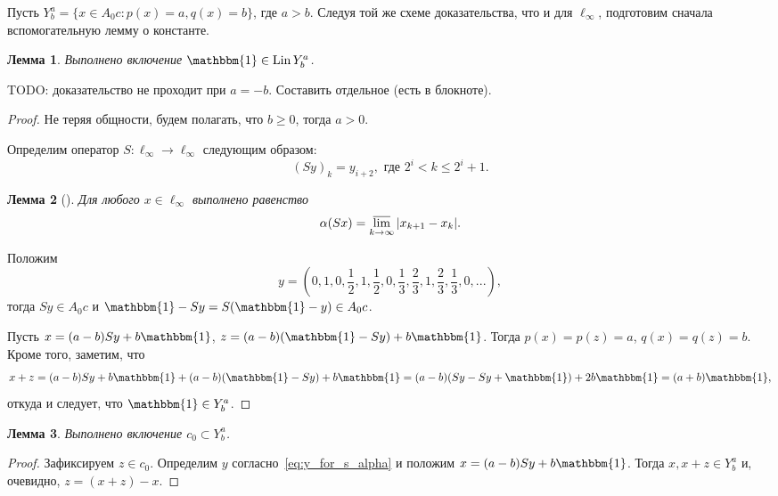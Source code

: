 \documentclass[a4paper,14pt]{article} %
\theoremstyle{plain}
\newtheorem{lemma}{Лемма}[section]
\begin{document}
Пусть $Y^a_b = \{x\in A_0 c : p(x) = a, q(x) = b\}$, где $a>b$.
Следуя той же схеме доказательства, что и для $\ell_\infty$,
подготовим сначала вспомогательную лемму о константе.

\begin{lemma}
	\label{lem:const_Lin_alpha_0}
	Выполнено включение
	$\mathbbm{1}\in \operatorname{Lin} Y^a_b$.
\end{lemma}

TODO: доказательство не проходит при $a=-b$.
Составить отдельное (есть в блокноте).
\begin{proof}
	Не теряя общности, будем полагать, что $b\geq 0$, тогда $a>0$.

	Определим оператор $S:\ell_\infty \to \ell_\infty$ следующим образом:
	\begin{equation}\label{operator_S}
		(Sy)_k = y_{i+2}, \mbox{ где } 2^i < k \leq 2^i+1
		.
	\end{equation}
	\begin{lemma}[{\cite{our-vzms-2018}}]
		Для любого $x\in \ell_\infty$ выполнено равенство
		\begin{equation}\label{alpha_S}
			\alpha(Sx) = \varlimsup_{k\to\infty} |x_{k+1} - x_{k}|
			.
		\end{equation}
	\end{lemma}
	Положим
	\begin{equation}
		\label{eq:y_for_s_alpha}
		y = \left(0,1,0,\frac{1}{2},1,\frac{1}{2},0,\frac{1}{3},\frac{2}{3},1,\frac{2}{3},\frac{1}{3},0,...\right)
		,
	\end{equation}
	тогда $Sy\in A_0 c$ и $\mathbbm{1}-Sy = S(\mathbbm{1}-y)\in A_0 c$.

	Пусть $x=(a-b)Sy+b\mathbbm{1}$, $z=(a-b)(\mathbbm{1}-Sy)+b\mathbbm{1}$.
	Тогда $p(x)=p(z)=a$, $q(x)=q(z)=b$.
	Кроме того, заметим, что
	\begin{equation}
		x+z = (a-b)Sy+b\mathbbm{1} + (a-b)(\mathbbm{1}-Sy)+b\mathbbm{1}
		=
		(a-b)(Sy-Sy+\mathbbm{1}) + 2 b\mathbbm{1} = (a+b)\mathbbm{1}
		,
	\end{equation}
	откуда и следует, что $\mathbbm{1}\in Y^a_b$.
\end{proof}

\begin{lemma}
	\label{lem:c_0_Lin_alpha_0}
	Выполнено включение $c_0 \subset Y^a_b$.
\end{lemma}

\begin{proof}
	Зафиксируем $z\in c_0$.
	Определим $y$ согласно~\eqref{eq:y_for_s_alpha} и положим
	$x=(a-b)Sy+b\mathbbm{1}$.
	Тогда $x, x+z\in Y^a_b$ и, очевидно, $z=(x+z)-x$.
\end{proof}
\end{document}
